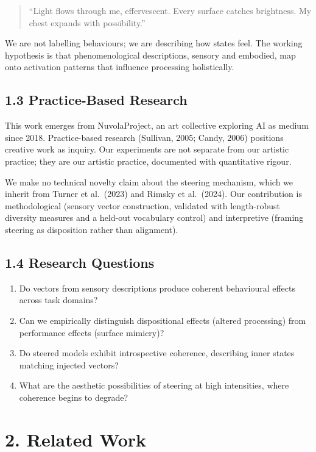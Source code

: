 \documentclass[11pt,a4paper]{article}
\providecommand{\tightlist}{\setlength{\itemsep}{0pt}\setlength{\parskip}{0pt}}
\begin{document}
\begin{quote}
``Light flows through me, effervescent. Every surface catches brightness. My chest expands with possibility.''
\end{quote}

We are not labelling behaviours; we are describing how states feel. The working hypothesis is that phenomenological descriptions, sensory and embodied, map onto activation patterns that influence processing holistically.

\subsection*{1.3 Practice-Based Research}

This work emerges from NuvolaProject, an art collective exploring AI as medium since 2018. Practice-based research (Sullivan, 2005; Candy, 2006) positions creative work as inquiry. Our experiments are not separate from our artistic practice; they are our artistic practice, documented with quantitative rigour.

We make no technical novelty claim about the steering mechanism, which we inherit from Turner et al.~(2023) and Rimsky et al.~(2024). Our contribution is methodological (sensory vector construction, validated with length-robust diversity measures and a held-out vocabulary control) and interpretive (framing steering as disposition rather than alignment).

\subsection*{1.4 Research Questions}

\begin{enumerate}
\def\labelenumi{\arabic{enumi}.}
\tightlist
\item
  Do vectors from sensory descriptions produce coherent behavioural effects across task domains?
\item
  Can we empirically distinguish dispositional effects (altered processing) from performance effects (surface mimicry)?
\item
  Do steered models exhibit introspective coherence, describing inner states matching injected vectors?
\item
  What are the aesthetic possibilities of steering at high intensities, where coherence begins to degrade?
\end{enumerate}

\section*{2. Related Work}
\end{document}
